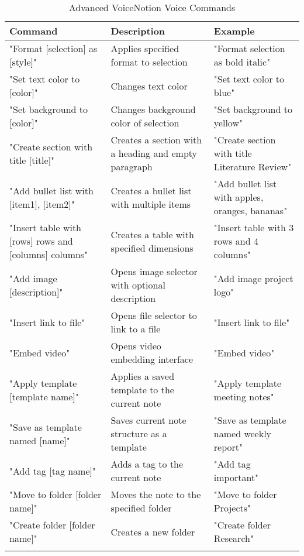 \begin{longtable}{p{}p{}p{}}
\toprule
\textbf{Command} & \textbf{Description} & \textbf{Example} \\
\midrule
\endhead

"Format [selection] as [style]" & Applies specified format to selection & "Format selection as bold italic" \\
"Set text color to [color]" & Changes text color & "Set text color to blue" \\
"Set background to [color]" & Changes background color of selection & "Set background to yellow" \\
\midrule

"Create section with title [title]" & Creates a section with a heading and empty paragraph & "Create section with title Literature Review" \\
"Add bullet list with [item1], [item2]" & Creates a bullet list with multiple items & "Add bullet list with apples, oranges, bananas" \\
"Insert table with [rows] rows and [columns] columns" & Creates a table with specified dimensions & "Insert table with 3 rows and 4 columns" \\
\midrule

"Add image [description]" & Opens image selector with optional description & "Add image project logo" \\
"Insert link to file" & Opens file selector to link to a file & "Insert link to file" \\
"Embed video" & Opens video embedding interface & "Embed video" \\
\midrule

"Apply template [template name]" & Applies a saved template to the current note & "Apply template meeting notes" \\
"Save as template named [name]" & Saves current note structure as a template & "Save as template named weekly report" \\
\midrule

"Add tag [tag name]" & Adds a tag to the current note & "Add tag important" \\
"Move to folder [folder name]" & Moves the note to the specified folder & "Move to folder Projects" \\
"Create folder [folder name]" & Creates a new folder & "Create folder Research" \\

\bottomrule
\caption{Advanced VoiceNotion Voice Commands}
\label{tab:advanced_commands}
\end{longtable}

